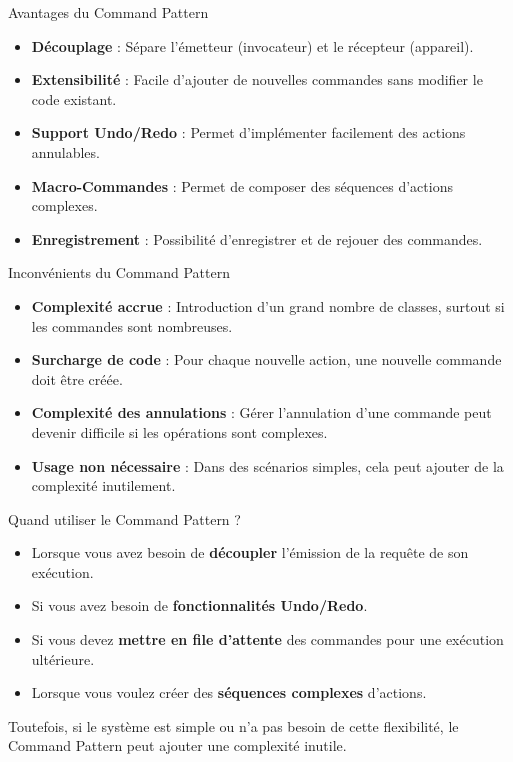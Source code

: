 \documentclass[aspectratio=169]{beamer}
\begin{document}
  \begin{frame}{Avantages du Command Pattern}
    \begin{itemize}
        \item \textbf{Découplage} : Sépare l'émetteur (invocateur) et le récepteur (appareil).
        \item \textbf{Extensibilité} : Facile d'ajouter de nouvelles commandes sans modifier le code existant.
        \item \textbf{Support Undo/Redo} : Permet d'implémenter facilement des actions annulables.
        \item \textbf{Macro-Commandes} : Permet de composer des séquences d'actions complexes.
        \item \textbf{Enregistrement} : Possibilité d'enregistrer et de rejouer des commandes.
    \end{itemize}
  \end{frame}

  \begin{frame}{Inconvénients du Command Pattern}
    \begin{itemize}
        \item \textbf{Complexité accrue} : Introduction d'un grand nombre de classes, surtout si les commandes sont nombreuses.
        \item \textbf{Surcharge de code} : Pour chaque nouvelle action, une nouvelle commande doit être créée.
        \item \textbf{Complexité des annulations} : Gérer l'annulation d'une commande peut devenir difficile si les opérations sont complexes.
        \item \textbf{Usage non nécessaire} : Dans des scénarios simples, cela peut ajouter de la complexité inutilement.
    \end{itemize}
  \end{frame}

  \begin{frame}{Quand utiliser le Command Pattern ?}
    \begin{itemize}
        \item Lorsque vous avez besoin de \textbf{découpler} l'émission de la requête de son exécution.
        \item Si vous avez besoin de \textbf{fonctionnalités Undo/Redo}.
        \item Si vous devez \textbf{mettre en file d'attente} des commandes pour une exécution ultérieure.
        \item Lorsque vous voulez créer des \textbf{séquences complexes} d'actions.
    \end{itemize}
    \pause
    Toutefois, si le système est simple ou n'a pas besoin de cette flexibilité, le Command Pattern peut ajouter une complexité inutile.
  \end{frame}
\end{document}
